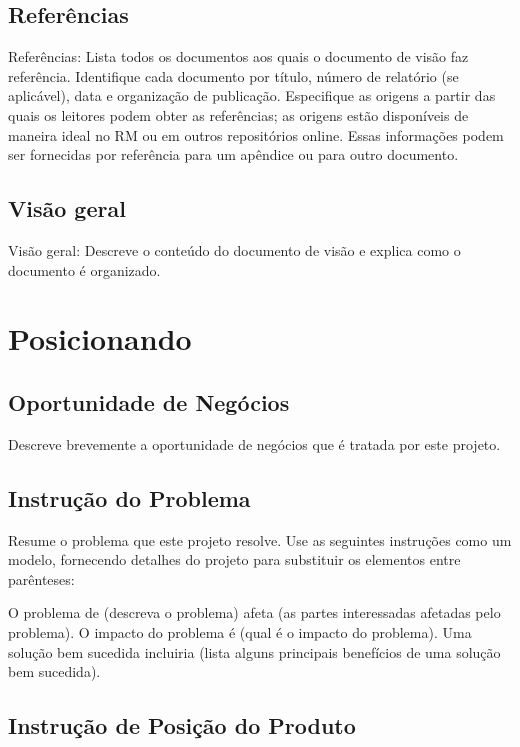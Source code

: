 \documentclass{report}
\begin{document}
\section{Referências}

Referências: Lista todos os documentos aos quais o documento de visão faz
referência. Identifique cada documento por título, número de relatório (se
aplicável), data e organização de publicação. Especifique as origens a partir
das quais os leitores podem obter as referências; as origens estão disponíveis
de maneira ideal no RM ou em outros repositórios online. Essas informações
podem ser fornecidas por referência para um apêndice ou para outro documento.

\section{Visão geral}

Visão geral: Descreve o conteúdo do documento de visão e explica como o
documento é organizado.

\chapter{Posicionando}

\section{Oportunidade de Negócios}

Descreve brevemente a oportunidade de negócios que é tratada por este projeto.

\section{Instrução do Problema}

Resume o problema que este projeto resolve. Use as seguintes instruções como um
modelo, fornecendo detalhes do projeto para substituir os elementos entre
parênteses:

O problema de (descreva o problema) afeta (as partes interessadas afetadas pelo
problema). O impacto do problema é (qual é o impacto do problema). Uma solução
bem sucedida incluiria (lista alguns principais benefícios de uma solução bem
sucedida).

\section{Instrução de Posição do Produto}
\end{document}
